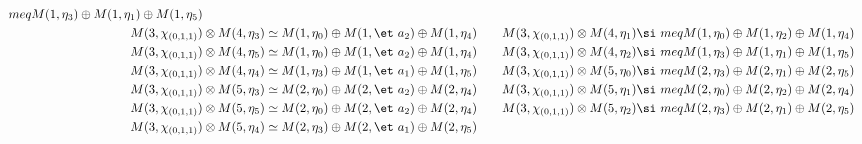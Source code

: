 \begin{align*}
meq M(1,\eta_{3}) \oplus M(1,\eta_{1}) \oplus M(1,\eta_{5})\\
M(3,\chi_{(0,1,1)}) &\otimes M(4,\eta_{3}) \simeq M(1,\eta_{0}) \oplus M(1,\et\
a_{2}) \oplus M(1,\eta_{4}) &&& M(3,\chi_{(0,1,1)}) &\otimes M(4,\eta_{1}) \si\
meq M(1,\eta_{0}) \oplus M(1,\eta_{2}) \oplus M(1,\eta_{4})\\
M(3,\chi_{(0,1,1)}) &\otimes M(4,\eta_{5}) \simeq M(1,\eta_{0}) \oplus M(1,\et\
a_{2}) \oplus M(1,\eta_{4}) &&& M(3,\chi_{(0,1,1)}) &\otimes M(4,\eta_{2}) \si\
meq M(1,\eta_{3}) \oplus M(1,\eta_{1}) \oplus M(1,\eta_{5})\\
M(3,\chi_{(0,1,1)}) &\otimes M(4,\eta_{4}) \simeq M(1,\eta_{3}) \oplus M(1,\et\
a_{1}) \oplus M(1,\eta_{5}) &&& M(3,\chi_{(0,1,1)}) &\otimes M(5,\eta_{0}) \si\
meq M(2,\eta_{3}) \oplus M(2,\eta_{1}) \oplus M(2,\eta_{5})\\
M(3,\chi_{(0,1,1)}) &\otimes M(5,\eta_{3}) \simeq M(2,\eta_{0}) \oplus M(2,\et\
a_{2}) \oplus M(2,\eta_{4}) &&& M(3,\chi_{(0,1,1)}) &\otimes M(5,\eta_{1}) \si\
meq M(2,\eta_{0}) \oplus M(2,\eta_{2}) \oplus M(2,\eta_{4})\\
M(3,\chi_{(0,1,1)}) &\otimes M(5,\eta_{5}) \simeq M(2,\eta_{0}) \oplus M(2,\et\
a_{2}) \oplus M(2,\eta_{4}) &&& M(3,\chi_{(0,1,1)}) &\otimes M(5,\eta_{2}) \si\
meq M(2,\eta_{3}) \oplus M(2,\eta_{1}) \oplus M(2,\eta_{5})\\
M(3,\chi_{(0,1,1)}) &\otimes M(5,\eta_{4}) \simeq M(2,\eta_{3}) \oplus M(2,\et\
a_{1}) \oplus M(2,\eta_{5})\\
\end{align*}

